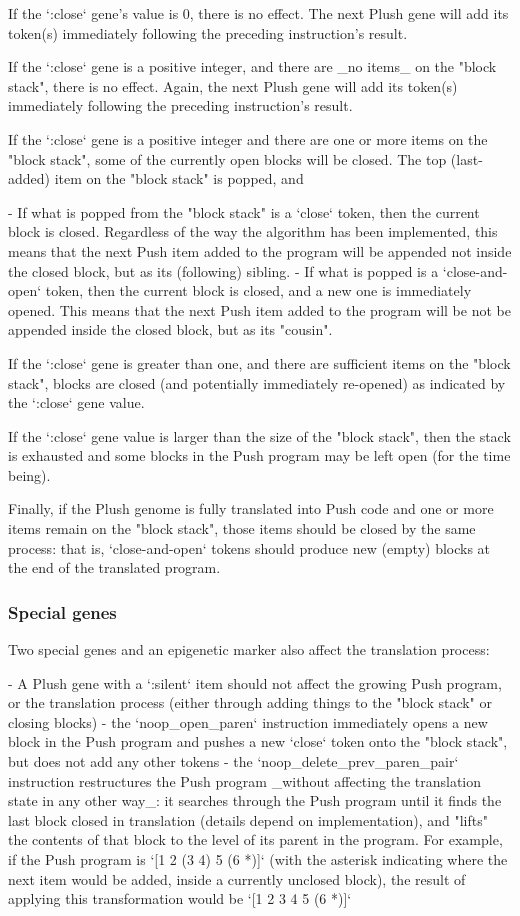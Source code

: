 If the `:close` gene's value is 0, there is no effect. The next Plush gene will add its token(s) immediately following the preceding instruction's result.

If the `:close` gene is a positive integer, and there are \_no items\_ on the "block stack", there is no effect. Again, the next Plush gene will add its token(s) immediately following the preceding instruction's result.

If the `:close` gene is a positive integer and there are one or more items on the "block stack", some of the currently open blocks will be closed. The top (last-added) item on the "block stack" is popped, and

- If what is popped from the "block stack" is a `close` token, then the current block is closed. Regardless of the way the algorithm has been implemented, this means that the next Push item added to the program will be appended not inside the closed block, but as its (following) sibling.
- If what is popped is a `close-and-open` token, then the current block is closed, and a new one is immediately opened. This means that the next Push item added to the program will be not be appended inside the closed block, but as its "cousin".

If the `:close` gene is greater than one, and there are sufficient items on the "block stack", blocks are closed (and potentially immediately re-opened) as indicated by the `:close` gene value.

If the `:close` gene value is larger than the size of the "block stack", then the stack is exhausted and some blocks in the Push program may be left open (for the time being).

Finally, if the Plush genome is fully translated into Push code and one or more items remain on the "block stack", those items should be closed by the same process: that is, `close-and-open` tokens should produce new (empty) blocks at the end of the translated program.

\subsubsection{ Special genes}

Two special genes and an epigenetic marker also affect the translation process:

- A Plush gene with a `:silent` item should not affect the growing Push program, or the translation process (either through adding things to the "block stack" or closing blocks)
- the  `noop\_open\_paren`  instruction immediately opens a new block in the Push program and pushes a new `close` token onto the "block stack", but does not add any other tokens
- the  `noop\_delete\_prev\_paren\_pair`  instruction restructures the Push program \_without affecting the translation state in any other way\_: it searches through the Push program until it finds the last block closed in translation (details depend on implementation), and "lifts" the contents of that block to the level of its parent in the program. For example, if the Push program is `[1 2 (3 4) 5 (6 *)]` (with the asterisk indicating where the next item would be added, inside a currently unclosed block), the result of applying this transformation would be `[1 2 3 4 5 (6 *)]`

